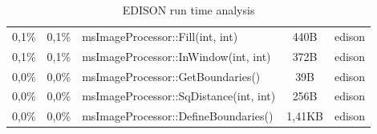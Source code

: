 \begin{table}[ht]
\begin{tabularx}{\textwidth}{cclcc}
	0,1\% & 	0,1\% & 	msImageProcessor::Fill(int, int) & 				440B & 	edison \\
	0,1\% & 	0,1\% & 	msImageProcessor::InWindow(int, int) & 			372B &	edison \\
	0,0\% & 	0,0\% &	msImageProcessor::GetBoundaries() &				39B & 	edison \\
	0,0\% & 	0,0\% & 	msImageProcessor::SqDistance(int, int) & 			256B & 	edison \\ 
	0,0\% & 	0,0\% & 	msImageProcessor::DefineBoundaries() &			1,41KB & edison \\ 
    \bottomrule
  \end{tabularx}
  \caption[EDISON run time profile]{\gls{EDISON} run time analysis}
  \label{tab:comp}
\end{table}




